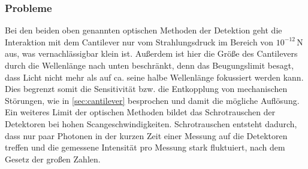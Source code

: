     \subsubsection*{Probleme}
        Bei den beiden oben genannten optischen Methoden der Detektion geht die Interaktion mit dem Cantilever nur vom Strahlungsdruck im Bereich von $10^{-12}\,$N aus, was vernachlässigbar klein ist.
        Außerdem ist hier die Größe des Cantilevers durch die Wellenlänge nach unten beschränkt, denn das Beugungslimit besagt, dass Licht nicht mehr als auf ca. seine halbe Wellenlänge fokussiert werden kann.
        Dies begrenzt somit die Sensitivität bzw. die Entkopplung von mechanischen Störungen, wie in \autoref{sec:cantilever} besprochen und damit die mögliche Auflösung.
        Ein weiteres Limit der optischen Methoden bildet das Schrotrauschen der Detektoren bei hohen Scangeschwindigkeiten.
        Schrotrauschen entsteht dadurch, dass nur paar Photonen in der kurzen Zeit einer Messung auf die Detektoren treffen und die gemessene Intensität pro Messung stark fluktuiert, nach dem Gesetz der großen Zahlen.


